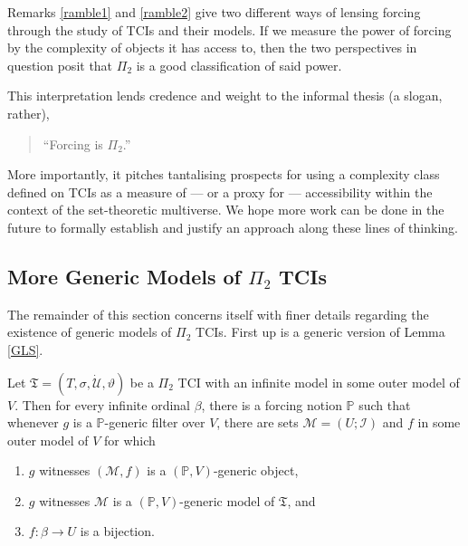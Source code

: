 \documentclass[12pt]{article}
\numberwithin{equation}{section}
\begin{document}
Remarks \ref{ramble1} and \ref{ramble2} give two different ways of lensing forcing through the study of TCIs and their models. If we measure the power of forcing by the complexity of objects it has access to, then the two perspectives in question posit that $\Pi_2$ is a good classification of said power.  

This interpretation lends credence and weight to the informal thesis (a slogan, rather), 
\begin{quote}
    \centering
    ``Forcing is $\Pi_2$.''
\end{quote}
More importantly, it pitches tantalising prospects for using a complexity class defined on TCIs as a measure of --- or a proxy for --- accessibility within the context of the set-theoretic multiverse. We hope more work can be done in the future to formally establish and justify an approach along these lines of thinking.

\subsection{More Generic Models of \texorpdfstring{$\Pi_2$}{} TCIs}

The remainder of this section concerns itself with finer details regarding the existence of generic models of $\Pi_2$ TCIs. First up is a generic version of Lemma \ref{GLS}.

\begin{lem}\label{genericls}
Let $\mathfrak{T} = (T, \sigma, \dot{\mathcal{U}}, \vartheta)$ be a $\Pi_2$ TCI with an infinite model in some outer model of $V$. Then for every infinite ordinal $\beta$, there is a forcing notion $\mathbb{P}$ such that whenever $g$ is a $\mathbb{P}$-generic filter over $V$, there are sets $\mathcal{M} = (U; \mathcal{I})$ and $f$ in some outer model of $V$ for which  
\begin{enumerate}[label=(\alph*)]
    \item\label{ggls0} $g$ witnesses $(\mathcal{M}, f)$ is a $(\mathbb{P}, V)$-generic object, 
    \item\label{gglsa} $g$ witnesses $\mathcal{M}$ is a $(\mathbb{P}, V)$-generic model of $\mathfrak{T}$, and
    \item\label{gglsb} $f : \beta \longrightarrow U$ is a bijection.
\end{enumerate}
\end{lem}
\end{document}
